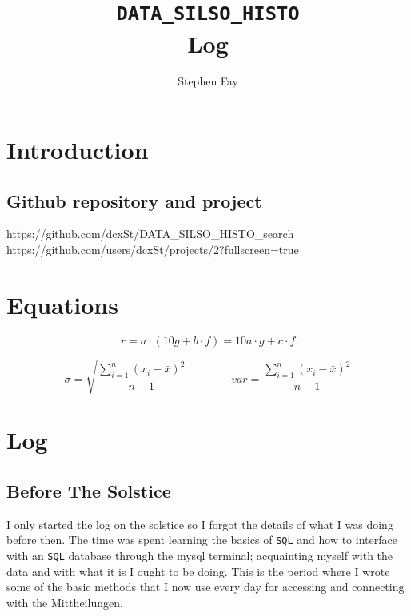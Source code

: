 \documentclass[12pt]{article}
\renewcommand\qedsymbol{$\Smiley$}%
\begin{document}
 
 
\title{\texttt{DATA\_SILSO\_HISTO}\\Log}
\author{Stephen Fay}
\maketitle

\tableofcontents

\section{Introduction}
\subsection{Github repository and project}
    https://github.com/dcxSt/DATA\_SILSO\_HISTO\_search \\
    https://github.com/users/dcxSt/projects/2?fullscreen=true

\section{Equations}

\begin{equation}\label{derivde equation}
    r = a\cdot(10 g + b\cdot f) = 10 a\cdot g + c\cdot f
\end{equation}

\begin{equation}\label{standard deviation equation}
    \sigma = \sqrt{\frac{\sum_{i=1}^{n} (x_i - \bar{x})^2}{n-1}}  \quad \quad \quad \quad 
    var = \frac{\sum_{i=1}^{n} (x_i - \bar{x})^2}{n-1}
\end{equation}

\section{Log}

\subsection{Before The Solstice}
I only started the log on the solstice so I forgot the details of what I was doing before then. The time was spent learning the basics of \texttt{SQL} and how to interface with an \texttt{SQL} database through the mysql terminal; acquainting myself with the data and with what it is I ought to be doing. This is the period where I wrote some of the basic methods that I now use every day for accessing and connecting with the Mittheilungen.
\end{document}
